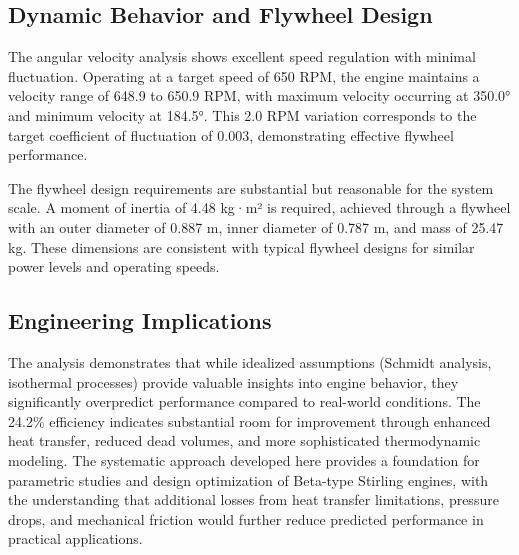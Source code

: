 \documentclass[12pt]{article}
\begin{document}
\subsection{Dynamic Behavior and Flywheel Design}
The angular velocity analysis shows excellent speed regulation with minimal fluctuation. Operating at a target speed of 650 RPM, the engine maintains a velocity range of 648.9 to 650.9 RPM, with maximum velocity occurring at 350.0° and minimum velocity at 184.5°. This 2.0 RPM variation corresponds to the target coefficient of fluctuation of 0.003, demonstrating effective flywheel performance.

The flywheel design requirements are substantial but reasonable for the system scale. A moment of inertia of 4.48 kg·m² is required, achieved through a flywheel with an outer diameter of 0.887 m, inner diameter of 0.787 m, and mass of 25.47 kg. These dimensions are consistent with typical flywheel designs for similar power levels and operating speeds.

\subsection{Engineering Implications}
The analysis demonstrates that while idealized assumptions (Schmidt analysis, isothermal processes) provide valuable insights into engine behavior, they significantly overpredict performance compared to real-world conditions. The 24.2\% efficiency indicates substantial room for improvement through enhanced heat transfer, reduced dead volumes, and more sophisticated thermodynamic modeling. The systematic approach developed here provides a foundation for parametric studies and design optimization of Beta-type Stirling engines, with the understanding that additional losses from heat transfer limitations, pressure drops, and mechanical friction would further reduce predicted performance in practical applications.
\end{document}
